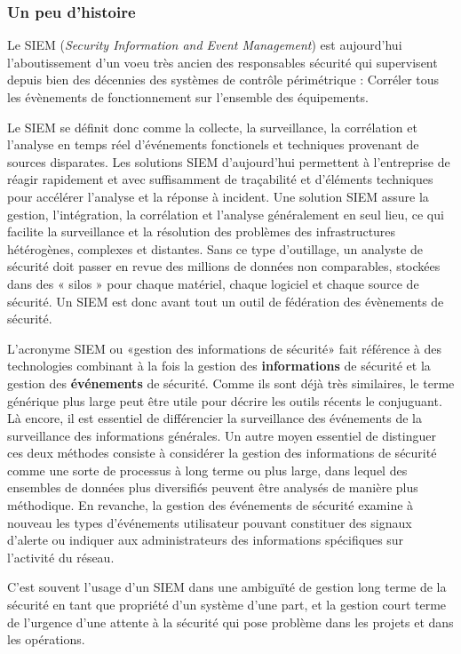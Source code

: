 \subsubsection{Un peu d'histoire}

Le SIEM (\textit{Security Information and Event Management})  est aujourd'hui l'aboutissement d'un voeu  très ancien des responsables sécurité qui supervisent depuis bien des décennies des systèmes de contrôle périmétrique : Corréler tous les évènements de fonctionnement sur l'ensemble des équipements. 

Le SIEM se définit donc comme la collecte, la surveillance, la corrélation et l’analyse en temps réel d'événements fonctionels et techniques provenant de sources disparates. Les solutions SIEM d’aujourd’hui permettent à l'entreprise de réagir rapidement et avec suffisamment de traçabilité et d'éléments techniques pour  accélérer l'analyse et la réponse à incident.
Une solution SIEM assure la gestion, l’intégration, la corrélation et l’analyse généralement en seul lieu, ce qui facilite la surveillance et la résolution des problèmes des infrastructures hétérogènes, complexes et distantes. Sans ce type d'outillage, un analyste de sécurité doit passer en revue des millions de données non comparables, stockées dans des « silos » pour chaque matériel, chaque logiciel et chaque source de sécurité. Un SIEM est donc avant tout un outil de fédération des évènements de sécurité.

L'acronyme SIEM ou «gestion des informations de sécurité» fait référence à des technologies combinant à la fois la gestion des \textbf{informations} de sécurité et la gestion des \textbf{événements} de sécurité. Comme ils sont déjà très similaires, le terme générique plus large peut être utile pour décrire les outils récents  le conjuguant. Là encore, il est essentiel de différencier la surveillance des événements de la surveillance des informations générales. Un autre moyen essentiel de distinguer ces deux méthodes consiste à considérer la gestion des informations de sécurité comme une sorte de processus à long terme ou plus large, dans lequel des ensembles de données plus diversifiés peuvent être analysés de manière plus méthodique. En revanche, la gestion des événements de sécurité examine à nouveau les types d’événements utilisateur pouvant constituer des signaux d’alerte ou indiquer aux administrateurs des informations spécifiques sur l’activité du réseau.

C'est souvent l'usage d'un SIEM dans une ambiguïté de gestion long terme de la sécurité en tant que propriété d'un système d'une part, et la gestion court terme de l'urgence d'une attente à la sécurité qui pose problème dans les projets et dans les opérations.
 
